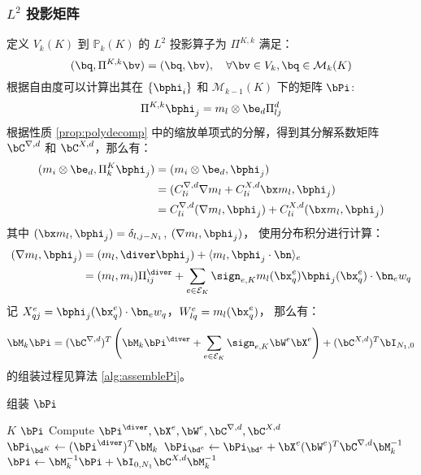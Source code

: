 \subsubsection{$L^2$ 投影矩阵}
定义 $V_k(K)$ 到 $\mathbb{P}_{k}(K)$ 的 $L^2$ 投影算子为 $\Pi^{K, k}$ 满足：
$$
(\bq, \Pi^{K, k}\bv) = (\bq, \bv), \quad \forall \bv \in V_k, \bq \in
\mathcal{M}_{k}(K)
$$
根据自由度可以计算出其在 $\{\bphi_i\}$ 和 $\mathcal{M}_{k-1}(K)$ 下的矩阵
$\bPi$:
$$
\Pi^{K, k}\bphi_j = m_l \otimes \be_d \Pi_{lj}^d
$$
根据性质 \eqref{prop:polydecomp} 中的缩放单项式的分解，得到其分解系数矩阵
$\bC^{\nabla, d}$ 和 $\bC^{X, d}$，那么有：
$$
\begin{aligned}
    (m_i\otimes \be_d, \Pi_k^{K}\bphi_j) & = (m_i\otimes \be_d, \bphi_j)\\
    & = (C^{\nabla, d}_{li}\nabla m_l + C_{li}^{X, d}\bx m_l, \bphi_j)\\
    & = C_{li}^{\nabla, d}(\nabla m_l, \bphi_j) + C_{li}^{X, d}(\bx m_l, \bphi_j)
\end{aligned}
$$
其中 $(\bx m_l, \bphi_j) = \delta_{l, j-N_1}$, $(\nabla m_l, \bphi_j)$，
使用分布积分进行计算：
$$
\begin{aligned}
(\nabla m_l, \bphi_j) & = (m_l, \diver\bphi_j) + \langle m_l, \bphi_j\cdot \bn
\rangle_e \\
& = (m_l, m_i)\Pi_{ij}^{\diver} + \sum_{e\in \mathcal{E}_K}\sign_{e, K}
m_l(\bx_q^e)\bphi_j(\bx_q^e)\cdot \bn_e w_q
\end{aligned}
$$
记 $X^e_{qj} = \bphi_j(\bx_q^e)\cdot \bn_e w_q$，$W^e_{lq} = m_l(\bx_q^e)$，
那么有：
$$
\bM_k\bPi = (\bC^{\nabla, d})^T\left(\bM_k\bPi^{\diver} + \sum_{e\in
    \mathcal{E}_K}
\sign_{e, K}\bW^e\bX^e\right) + (\bC^{X, d})^T\bI_{N_1, 0}
$$
的组装过程见算法 \ref{alg:assemblePi}。
\begin{algorithm}
    \caption{组装 $\bPi$}\label{alg:assemblePi}
    \begin{algorithmic}[1]
    \Require $K$
    \Ensure $\bPi$
    \State Compute $\bPi^{\diver}, \bX^e, \bW^e, \bC^{\nabla, d}, \bC^{X, d}$
    \State $\bPi_{\bd^K} \gets (\bPi^{\diver})^T\bM_{k}$
        \State $\bPi_{\bd^e} \gets \bPi_{\bd^e} + \bX^e (\bW^e)^T\bC^{\nabla, d}\bM_k^{-1}$
    \EndFor
    \State $\bPi \gets \bM_k^{-1}\bPi + \bI_{0, N_1}\bC^{X, d} \bM_k^{-1}$
\end{algorithmic}
\end{algorithm}

